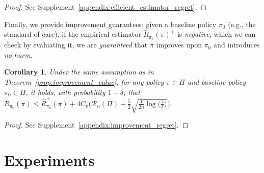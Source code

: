 \documentclass{article} %
\theoremstyle{plain}
\newtheorem{corollary}[theorem]{Corollary}
\theoremstyle{definition}
\theoremstyle{remark}
\begin{document}
\begin{proof}
See Supplement~\ref{appendix:efficient_estimator_regret}.
\end{proof}

Finally, we provide improvement guarantees: given a baseline policy $\pi_0$ (e.g., the standard of care), if the empirical estimator $\hat{R}_{\pi_0}(\pi)^+$ is \emph{negative}, which we can check by evaluating it, we are \emph{guaranteed} that $\pi$ improves upon $\pi_0$ and introduces \emph{no harm}.

\begin{corollary}
Under the same assumption as in Theorem~\ref{prop:improvement_value}, for any policy $\pi \in \Pi$ and baseline policy $\pi_0\in\Pi$, it holds, with probability $1-\delta$, that
    $R_{\pi_0}(\pi) \leq \hat{R}_{\pi_0}^{+}(\pi) +4 C_v \Big(\mathcal{R}_n(\Pi) + \frac{5}{2}\sqrt{\frac{1}{2n}\log\Big(\frac{2}{\delta}\Big)}\Big)$.
\end{corollary}

\begin{proof}
See Supplement~\ref{appendix:improvement_regret}.
\end{proof}

\section{Experiments}\label{sec:experiments}
\end{document}
